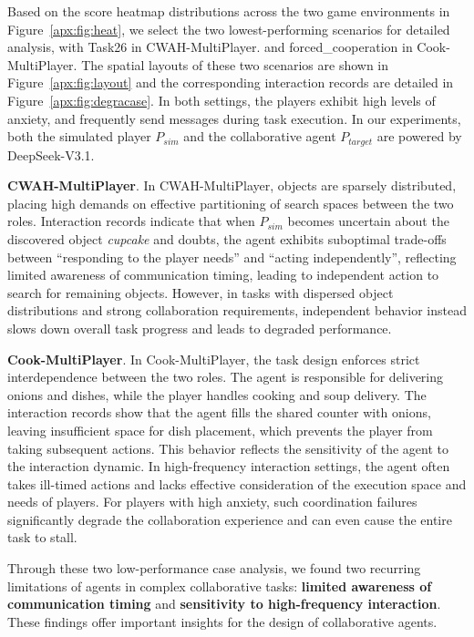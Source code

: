 \documentclass{article}
\theoremstyle{plain}
\theoremstyle{definition}
\theoremstyle{remark}
\begin{document}
Based on the score heatmap distributions across the two game environments in Figure~\ref{apx:fig:heat}, we select the two lowest-performing scenarios for detailed analysis, with Task26 in CWAH-MultiPlayer. and forced\_cooperation in Cook-MultiPlayer. The spatial layouts of these two scenarios are shown in Figure~\ref{apx:fig:layout} and the corresponding interaction records are detailed in Figure~\ref{apx:fig:degracase}. In both settings, the players exhibit high levels of anxiety, and frequently send messages during task execution. In our experiments, both the simulated player $P_{sim}$ and the collaborative agent $P_{target}$ are powered by DeepSeek-V3.1.

\textbf{CWAH-MultiPlayer}. In CWAH-MultiPlayer, objects are sparsely distributed, placing high demands on effective partitioning of search spaces between the two roles. Interaction records indicate that when $P_{sim}$ becomes uncertain about the discovered object \emph{cupcake} and doubts, the agent exhibits suboptimal trade-offs between ``responding to the player needs'' and ``acting independently'', reflecting limited awareness of communication timing, leading to independent action to search for remaining objects. However, in tasks with dispersed object distributions and strong collaboration requirements, independent behavior instead slows down overall task progress and leads to degraded performance.

\textbf{Cook-MultiPlayer}. In Cook-MultiPlayer, the task design enforces strict interdependence between the two roles. The agent is responsible for delivering onions and dishes, while the player handles cooking and soup delivery. The interaction records show that the agent fills the shared counter with onions, leaving insufficient space for dish placement, which prevents the player from taking subsequent actions. This behavior reflects the sensitivity of the agent to the interaction dynamic. In high-frequency interaction settings, the agent often takes ill-timed actions and lacks effective consideration of the execution space and needs of players. For players with high anxiety, such coordination failures significantly degrade the collaboration experience and can even cause the entire task to stall.

Through these two low-performance case analysis, we found two recurring limitations of agents in complex collaborative tasks: \textbf{limited awareness of communication timing} and \textbf{sensitivity to high-frequency interaction}. These findings offer important insights for the design of collaborative agents.
\end{document}
